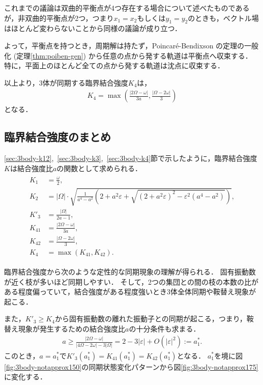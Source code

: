 \documentclass[../main]{subfiles}
\begin{document}
    これまでの議論は双曲的平衡点が4つ存在する場合について述べたものであるが，非双曲的平衡点が2つ，つまり$x_1=x_2$もしくは$y_1=y_2$のときも，ベクトル場はほとんど変わらないことから同様の議論が成り立つ．

    よって，平衡点を持つとき，周期解は持たず，Poincar\'{e}-Bendixson の定理の一般化 (定理\ref{thm:poiben-gen}) から任意の点から発する軌道は平衡点へ収束する．
    特に，平面上のほとんど全ての点から発する軌道は沈点に収束する．

    以上より，3体が同期する臨界結合強度$K_4$は，
    \begin{align}
        \label{eq:K4-approx}
        K_4=\max\left(\frac{|2\Omega-\omega|}{3a},\frac{|\Omega-2\omega|}{3}\right)
    \end{align}
    となる．
    
    \subsection{臨界結合強度のまとめ}
    \label{sec:3body-summary}
    \ref{sec:3body-k12},\ \ref{sec:3body-k3},\ \ref{sec:3body-k4}節で示したように，臨界結合強度$K$は結合強度比$a$の関数として求められる．
    \begin{align}
        \label{eq:3body-matome}
        \begin{split}
            K_1&=\frac{\omega}{2},\\
            K_2&=|\Omega|\cdot\sqrt{\frac{1}{a^4-a^2}\left(2+a^2\varepsilon+\sqrt{(2+a^2\varepsilon)^2-\varepsilon^2(a^4-a^2)}\right)},\\
            K'_3&=\frac{|\Omega|}{2a-1},\\
            K_{41}&=\frac{|2\Omega-\omega|}{3a},\\
            K_{42}&=\frac{|\Omega-2\omega|}{3},\\
            K_4&=\max\left(K_{41},K_{42}\right).
        \end{split}
    \end{align}

    臨界結合強度から次のような定性的な同期現象の理解が得られる．
    固有振動数が近く枝が多いほど同期しやすい．
    そして，2つの集団との間の枝の本数の比がある程度偏っていて，結合強度がある程度強いとき3体全体同期や鞍替え現象が起こる．
    
    また，$K'_3\geq K_4$から固有振動数の離れた振動子との同期が起こる，つまり，鞍替え現象が発生するための結合強度比$a$の十分条件も求まる．
    \begin{align}
        \label{eq:a-ast1}
        a\geq \frac{|2\Omega-\omega|}{|4\Omega-2\omega|-3|\Omega|}= 2-3|\varepsilon|+O(|\varepsilon|^2):=a^\ast_1.    
    \end{align}
    このとき，$a=a^\ast_1$で$K'_{3}(a^\ast_1)=K_{41}(a^\ast_1)=K_{42}(a^\ast_1)$となる．
    $a^\ast_1$を境に図\ref{fig:3body-notapprox150}の同期状態変化パターンから図\ref{fig:3body-notapprox175}に変化する．
\end{document}
